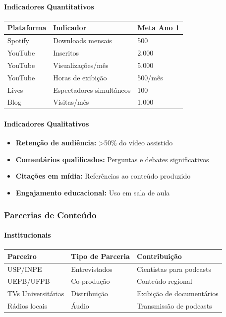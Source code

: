 \paragraph{Indicadores Quantitativos}

\bigskip\noindent
\begin{tabular}{p{}p{}p{}}
\toprule
Plataforma & Indicador & Meta Ano 1 \\
\hline
Spotify & Downloads mensais & 500 \\
YouTube & Inscritos & 2.000 \\
YouTube & Visualizações/mês & 5.000 \\
YouTube & Horas de exibição & 500/mês \\
Lives & Espectadores simultâneos & 100 \\
Blog & Visitas/mês & 1.000 \\
\bottomrule
\end{tabular}

\bigskip

\paragraph{Indicadores Qualitativos}

\begin{itemize}
\item \textbf{Retenção de audiência:} \textgreater 50\% do vídeo assistido
\item \textbf{Comentários qualificados:} Perguntas e debates significativos
\item \textbf{Citações em mídia:} Referências ao conteúdo produzido
\item \textbf{Engajamento educacional:} Uso em sala de aula
\end{itemize}

\subsubsection{Parcerias de Conteúdo}

\paragraph{Institucionais}

\bigskip\noindent
\begin{tabular}{p{}p{}p{}}
\toprule
Parceiro & Tipo de Parceria & Contribuição \\
\hline
USP/INPE & Entrevistados & Cientistas para podcasts \\
UEPB/UFPB & Co-produção & Conteúdo regional \\
TVs Universitárias & Distribuição & Exibição de documentários \\
Rádios locais & Áudio & Transmissão de podcasts \\
\bottomrule
\end{tabular}

